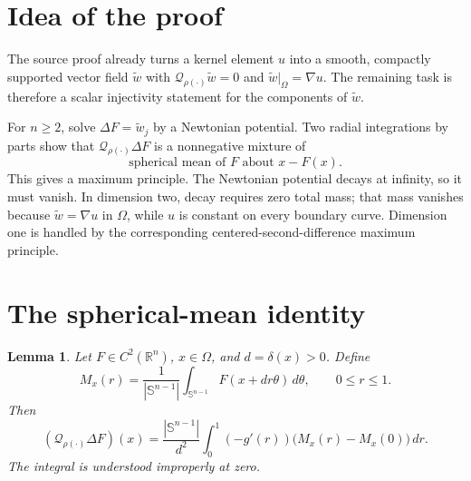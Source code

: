 \documentclass[11pt]{article}
\newtheorem{lemma}{Lemma}
\newcommand{\Qhet}{\mathcal Q_{\rho(\cdot)}}
\newcommand{\sphere}{\mathbb S^{n-1}}
\begin{document}
\section*{Idea of the proof}

The source proof already turns a kernel element \(u\) into a smooth,
compactly supported vector field \(\widetilde w\) with
\(\Qhet\widetilde w=0\) and
\(\widetilde w|_\Omega=\nabla u\). The remaining task is therefore a scalar
injectivity statement for the components of \(\widetilde w\).

For \(n\geq2\), solve \(\Delta F=\widetilde w_j\) by a Newtonian potential.
Two radial integrations by parts show that \(\Qhet\Delta F\) is a
nonnegative mixture of
\[
 \text{spherical mean of \(F\) about \(x\)}-F(x).
\]
This gives a maximum principle. The Newtonian potential decays at infinity,
so it must vanish. In dimension two, decay requires zero total mass; that
mass vanishes because \(\widetilde w=\nabla u\) in \(\Omega\), while \(u\)
is constant on every boundary curve. Dimension one is handled by the
corresponding centered-second-difference maximum principle.

\section*{The spherical-mean identity}

\begin{lemma}\label{lem:spherical}
Let \(F\in C^2(\mathbb R^n)\), \(x\in\Omega\), and \(d=\delta(x)>0\). Define
\[
 M_x(r)=\frac1{|\sphere|}
 \int_{\sphere}F(x+dr\theta)\,d\theta,\qquad 0\leq r\leq1.
\]
Then
\begin{equation}\label{eq:spherical}
 (\Qhet\Delta F)(x)
 =\frac{|\sphere|}{d^2}
 \int_0^1(-g'(r))\bigl(M_x(r)-M_x(0)\bigr)\,dr.
\end{equation}
The integral is understood improperly at zero.
\end{lemma}
\end{document}

